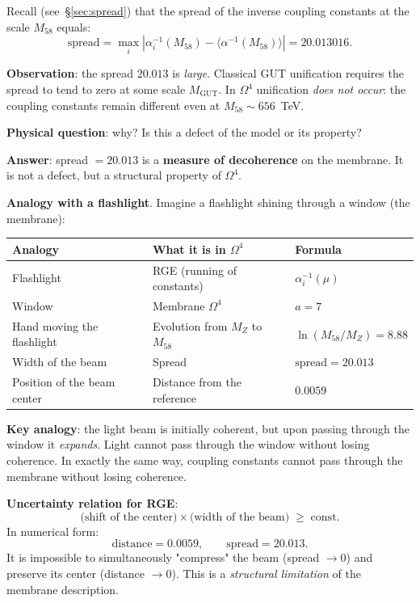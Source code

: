 \documentclass[11pt,a4paper]{article}
\newcommand{\Om}{\ensuremath{\Omega^4}}
\theoremstyle{definition}
\begin{document}
Recall (see~\S\ref{sec:spread}) that the spread of the inverse coupling
constants at the scale $M_{58}$ equals:
\begin{equation}
    \text{spread} = \max_{i} \left| \alpha_i^{-1}(M_{58})
    - \langle \alpha^{-1}(M_{58}) \rangle \right|
    = 20.013016.
    \label{eq:spread-recall-membrane}
\end{equation}

\medskip\noindent
\textbf{Observation}: the spread $20.013$ is \emph{large}.
Classical GUT unification requires the spread to tend
to zero at some scale $M_{\text{GUT}}$. In $\Om$
unification \emph{does not occur}: the coupling constants remain
different even at $M_{58} \sim 656$~TeV.

\medskip\noindent
\textbf{Physical question}: why? Is this a defect of the model
or its property?

\medskip\noindent
\textbf{Answer}: spread $= 20.013$ is
a \textbf{measure of decoherence} on the membrane. It is not a defect,
but a structural property of $\Om$.

\medskip\noindent
\textbf{Analogy with a flashlight}. Imagine a flashlight
shining through a window (the membrane):

\begin{center}
\begin{tabular}{p{3.5cm}p{4.5cm}p{4cm}}
\toprule
Analogy & What it is in $\Om$ & Formula \\
\midrule
Flashlight & RGE (running of constants) & $\alpha_i^{-1}(\mu)$ \\
Window & Membrane $\Om$ & $a = 7$ \\
Hand moving the flashlight & Evolution from $M_Z$ to $M_{58}$
    & $\ln(M_{58}/M_Z) = 8.88$ \\
Width of the beam & Spread & $\text{spread} = 20.013$ \\
Position of the beam center & Distance from the reference & $0.0059$ \\
\bottomrule
\end{tabular}
\end{center}

\medskip\noindent
\textbf{Key analogy}: the light beam is initially
coherent, but upon passing through the window it
\emph{expands}. Light cannot pass through the window
without losing coherence. In exactly the same way, coupling constants
cannot pass through the membrane without losing coherence.

\medskip\noindent
\textbf{Uncertainty relation for RGE}:
\begin{equation}
    \text{(shift of the center)} \times \text{(width of the beam)}
    \;\geq\; \text{const}.
    \label{eq:uncertainty-rge}
\end{equation}
In numerical form:
\begin{equation}
    \text{distance} = 0.0059, \qquad
    \text{spread} = 20.013.
\end{equation}
It is impossible to simultaneously "compress" the beam (spread $\to 0$)
and preserve its center (distance $\to 0$). This is
a \emph{structural limitation} of the membrane description.
\end{document}
